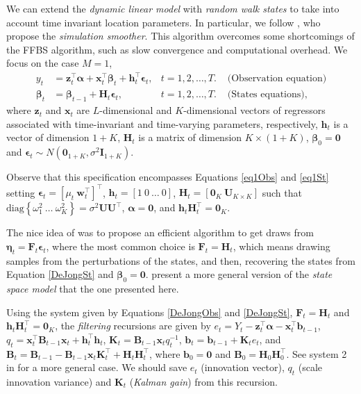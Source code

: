 We can extend the \textit{dynamic linear model} with \textit{random walk states} to take into account time invariant location parameters. In particular, we follow \cite{de1995simulation}, who propose the \textit{simulation smoother}. This algorithm overcomes some shortcomings of the FFBS algorithm, such as slow convergence and computational overhead. We focus on the case $M=1$, 
\begin{align}
	{y}_t&=\bm{z}_t^{\top}\bm{\alpha}+\bm{x}_t^{\top}\bm{\beta}_t+\bm{h}_t^{\top}\bm{\epsilon}_t,& t=1,2,\dots,T. & \text{   (Observation equation)}\label{DeJongObs}\\
	\bm{\beta}_t&=\bm{\beta}_{t-1}+\bm{H}_t\bm{\epsilon}_t, & t=1,2,\dots,T. & \text{   (States equations)}\label{DeJongSt},
\end{align}
where $\bm{z}_t$ and $\bm{x}_t$ are $L$-dimensional and $K$-dimensional vectors of regressors associated with time-invariant and time-varying parameters, respectively, $\bm{h}_t$ is a vector of dimension $1+K$, $\bm{H}_t$ is a matrix of dimension $K\times (1+K)$, $\bm{\beta}_0=\bm{0}$ and $\bm{\epsilon}_t\sim N(\bm{0}_{1+K},\sigma^2\bm{I}_{1+K})$.

Observe that this specification encompasses Equations \ref{eq1Obs} and \ref{eq1St} setting $\bm{\epsilon}_t=[\mu_t \ \bm{w}_t^{\top}]^{\top}$, $\bm{h}_t=[1 \ 0 \ \dots \ 0]$, $\bm{H}_t=[\bm{0}_K \ \bm{U}_{K\times K}]$ such that $\text{diag}\left\{\omega_1^2 \ \dots \ \omega_K^2\right\}=\sigma^2\bm{U}\bm{U}^{\top}$, $\bm{\alpha}=\bm{0}$, and $\bm{h}_t\bm{H}_t^{\top}=\bm{0}_{K}$.

The nice idea of \cite{de1995simulation} was to propose an efficient algorithm to get draws from $\bm{\eta}_t=\bm{F}_t\bm{\epsilon}_t$, where the most common choice is $\bm{F}_t=\bm{H}_t$, which means drawing samples from the perturbations of the states, and then, recovering the states from Equation \ref{DeJongSt} and $\bm{\beta}_0=\bm{0}$. \cite{de1995simulation} present a more general version of the \textit{state space model} that the one presented here. 

Using the system given by Equations \ref{DeJongObs} and \ref{DeJongSt}, $\bm{F}_t=\bm{H}_t$ and $\bm{h}_t\bm{H}_t^{\top}=\bm{0}_{K}$, the \textit{filtering} recursions are given by $e_t=Y_t-\bm{z}_t^{\top}\bm{\alpha}-\bm{x}_t^{\top}\bm{b}_{t-1}$, ${q}_t=\bm{x}_t^{\top}\bm{B}_{t-1}\bm{x}_t+\bm{h}_t^{\top}\bm{h}_t$, $\bm{K}_t=\bm{B}_{t-1}\bm{x}_tq_t^{-1}$, $\bm{b}_t=\bm{b}_{t-1}+\bm{K}_t e_t$, and $\bm{B}_t=\bm{B}_{t-1}-\bm{B}_{t-1}\bm{x}_t\bm{K}_t^{\top}+\bm{H}_t\bm{H}_t^{\top}$, where $\bm{b}_0=\bm{0}$ and $\bm{B}_0=\bm{H}_0\bm{H}_0^{\top}$. See system 2 in \cite{de1995simulation} for a more general case. We should save $e_t$ (innovation vector), $q_t$ (scale innovation variance) and $\bm{K}_t$ (\textit{Kalman gain}) from this recursion. 

